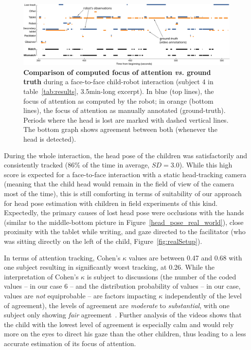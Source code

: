 \documentclass{sig-alternate}
\newcommand{\vs}{\textit{vs.}\xspace}
\begin{document}
\begin{figure}[ht!]
    \centering
    \includegraphics[width=\linewidth]{matches-excerpt}
    \caption{\small \textbf{Comparison of computed focus of attention \vs ground
        truth} during a face-to-face child-robot interaction (subject 4
        in table~\ref{tab:results}, 3.5min-long excerpt).
        In blue (top lines), the focus of attention as computed by the robot;
        in orange (bottom lines), the focus of attention as manually annotated
        (ground-truth). Periods where the head is lost are marked with dashed
        vertical lines. The bottom graph shows agreement between both (whenever
        the head is detected).}

    \label{fig:realExpected}
    
\end{figure}


During the whole interaction, the head pose of the children was satisfactorily
and consistently tracked (86\% of the time in average, $SD=3.0$). While this
high score is expected for a face-to-face interaction with a static head-tracking camera
(meaning that the child head would remain in the field of view of the camera
most of the time), this is still comforting in terms of suitability of our
approach for head pose estimation with children in field experiments of this
kind. Expectedly, the primary causes of lost head pose were occlusions with the
hands (similar to the middle-bottom picture in
Figure~\ref{head_pose_real_world}), close proximity with the tablet while
writing, and gaze directed to the facilitator (who was sitting directly on the left of
the child, Figure~\ref{fig:realSetup}).

In terms of attention tracking, Cohen's $\kappa$ values are between 0.47 and
0.68 with one subject resulting in significantly worst tracking, at 0.26. While
the interpretation of Cohen's $\kappa$ is subject to discussions (the number of
the coded values -- in our case 6 -- and the distribution probability of values
-- in our case, values are \emph{not} equiprobable -- are factors impacting
$\kappa$ independently of the level of agreement), the levels of agreement are
\emph{moderate} to \emph{substantial}, with one subject only
showing \emph{fair} agreement~\cite{landis1977measurement}. Further analysis of
the videos shows that the child with the lowest level of agreement is especially
calm and would rely more on the eyes to direct his gaze than the other children,
thus leading to a less accurate estimation of its focus of attention.
\end{document}
